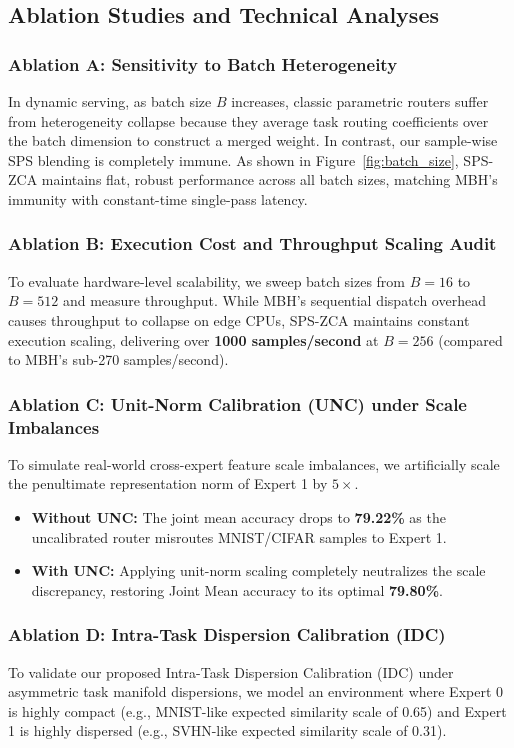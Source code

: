 \subsection{Ablation Studies and Technical Analyses}

\subsubsection{Ablation A: Sensitivity to Batch Heterogeneity}
In dynamic serving, as batch size $B$ increases, classic parametric routers suffer from heterogeneity collapse because they average task routing coefficients over the batch dimension to construct a merged weight.
In contrast, our sample-wise SPS blending is completely immune.
As shown in Figure~\ref{fig:batch_size}, SPS-ZCA maintains flat, robust performance across all batch sizes, matching MBH's immunity with constant-time single-pass latency.


\subsubsection{Ablation B: Execution Cost and Throughput Scaling Audit}
To evaluate hardware-level scalability, we sweep batch sizes from $B=16$ to $B=512$ and measure throughput.
While MBH's sequential dispatch overhead causes throughput to collapse on edge CPUs, SPS-ZCA maintains constant execution scaling, delivering over \textbf{1000 samples/second} at $B=256$ (compared to MBH's sub-270 samples/second).


\subsubsection{Ablation C: Unit-Norm Calibration (UNC) under Scale Imbalances}
To simulate real-world cross-expert feature scale imbalances, we artificially scale the penultimate representation norm of Expert 1 by $5\times$.
\begin{itemize}
    \item \textbf{Without UNC:} The joint mean accuracy drops to \textbf{79.22\%} as the uncalibrated router misroutes MNIST/CIFAR samples to Expert 1.
    \item \textbf{With UNC:} Applying unit-norm scaling completely neutralizes the scale discrepancy, restoring Joint Mean accuracy to its optimal \textbf{79.80\%}.
\end{itemize}

\subsubsection{Ablation D: Intra-Task Dispersion Calibration (IDC)}
To validate our proposed Intra-Task Dispersion Calibration (IDC) under asymmetric task manifold dispersions, we model an environment where Expert 0 is highly compact (e.g., MNIST-like expected similarity scale of 0.65) and Expert 1 is highly dispersed (e.g., SVHN-like expected similarity scale of 0.31).



